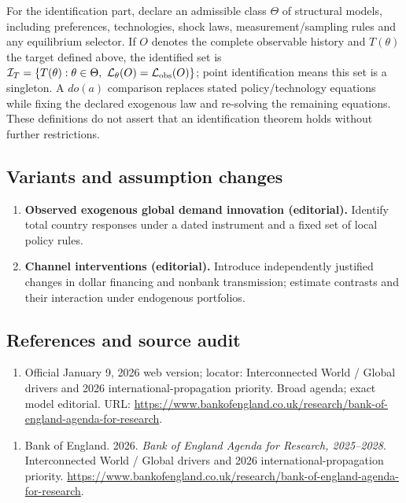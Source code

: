 \documentclass[11pt,a4paper]{article}
\begin{document}
For the identification part, declare an admissible class \(\Theta\) of structural models, including preferences, technologies, shock laws, measurement/sampling rules and any equilibrium selector. If \(O\) denotes the complete observable history and \(T(\theta)\) the target defined above, the identified set is \(\mathcal I_T=\{T(\theta):\theta\in\Theta,\ \mathcal L_\theta(O)=\mathcal L_{\rm obs}(O)\}\); point identification means this set is a singleton. A \(do(a)\) comparison replaces stated policy/technology equations while fixing the declared exogenous law and re-solving the remaining equations. These definitions do not assert that an identification theorem holds without further restrictions.
\subsection*{Variants and assumption changes}
\begin{enumerate}
\item \textbf{Observed exogenous global demand innovation (editorial).} Identify total country responses under a dated instrument and a fixed set of local policy rules.
\item \textbf{Channel interventions (editorial).} Introduce independently justified changes in dollar financing and nonbank transmission; estimate contrasts and their interaction under endogenous portfolios.
\end{enumerate}
\subsection*{References and source audit}
\begin{enumerate}
\item Official January 9, 2026 web version; locator: Interconnected World / Global drivers and 2026 international-propagation priority. Broad agenda; exact model editorial. URL: \url{https://www.bankofengland.co.uk/research/bank-of-england-agenda-for-research}.
\end{enumerate}
\begin{enumerate}\raggedright
\item\hypertarget{definitions:source:30007615:1}{} Bank of England. 2026. \emph{Bank of England Agenda for Research, 2025–2028}. Interconnected World / Global drivers and 2026 international-propagation priority.
\url{https://www.bankofengland.co.uk/research/bank-of-england-agenda-for-research}.
\end{enumerate}
\end{document}
